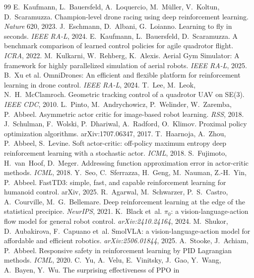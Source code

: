 \documentclass[11pt,a4paper]{article}
\begin{document}
\begin{thebibliography}{99}\small
{} E.~Kaufmann, L.~Bauersfeld, A.~Loquercio, M.~M\"uller, V.~Koltun, D.~Scaramuzza.
Champion-level drone racing using deep reinforcement learning. \emph{Nature} 620, 2023.
 J.~Eschmann, D.~Albani, G.~Loianno. Learning to fly in seconds. \emph{IEEE RA-L}, 2024.
 E.~Kaufmann, L.~Bauersfeld, D.~Scaramuzza. A benchmark comparison of learned control
policies for agile quadrotor flight. \emph{ICRA}, 2022.
 M.~Kulkarni, W.~Rehberg, K.~Alexis. Aerial Gym Simulator: A framework for highly parallelized
simulation of aerial robots. \emph{IEEE RA-L}, 2025.
 B.~Xu et al. OmniDrones: An efficient and flexible platform for reinforcement learning in drone
control. \emph{IEEE RA-L}, 2024.
 T.~Lee, M.~Leok, N.~H.~McClamroch. Geometric tracking control of a quadrotor UAV on SE(3).
\emph{IEEE CDC}, 2010.
 L.~Pinto, M.~Andrychowicz, P.~Welinder, W.~Zaremba, P.~Abbeel. Asymmetric actor critic for
image-based robot learning. \emph{RSS}, 2018.
 J.~Schulman, F.~Wolski, P.~Dhariwal, A.~Radford, O.~Klimov. Proximal policy optimization
algorithms. arXiv:1707.06347, 2017.
 T.~Haarnoja, A.~Zhou, P.~Abbeel, S.~Levine. Soft actor-critic: off-policy maximum entropy deep
reinforcement learning with a stochastic actor. \emph{ICML}, 2018.
 S.~Fujimoto, H.~van~Hoof, D.~Meger. Addressing function approximation error in actor-critic
methods. \emph{ICML}, 2018.
 Y.~Seo, C.~Sferrazza, H.~Geng, M.~Nauman, Z.-H.~Yin, P.~Abbeel. FastTD3: simple, fast, and capable
reinforcement learning for humanoid control. arXiv, 2025.
 R.~Agarwal, M.~Schwarzer, P.~S.~Castro, A.~Courville, M.~G.~Bellemare. Deep reinforcement learning at the edge of the statistical precipice. \emph{NeurIPS}, 2021.
 K.~Black et~al. $\pi_0$: a vision-language-action flow model for general robot control. \emph{arXiv:2410.24164}, 2024.
 M.~Shukor, D.~Aubakirova, F.~Capuano et~al. SmolVLA: a vision-language-action model for affordable and efficient robotics. \emph{arXiv:2506.01844}, 2025.
 A.~Stooke, J.~Achiam, P.~Abbeel. Responsive safety in reinforcement learning by PID Lagrangian
methods. \emph{ICML}, 2020.
 C.~Yu, A.~Velu, E.~Vinitsky, J.~Gao, Y.~Wang, A.~Bayen, Y.~Wu. The surprising effectiveness of PPO in

\end{thebibliography}
\end{document}
